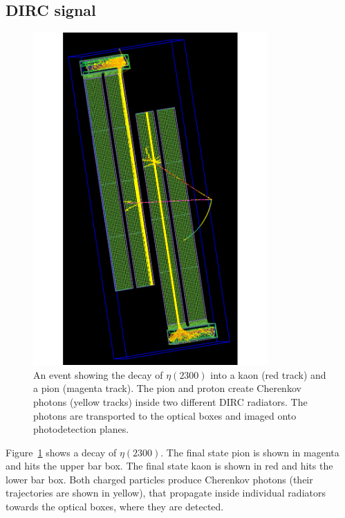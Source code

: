 \subsection{DIRC signal}

\begin{figure}[!h]
\centering
\includegraphics[angle=270,width=0.8\textwidth]{pics/eta2300decay.pdf}
\caption{\label{pic:eta2300}
An event showing the decay of $\eta(2300)$ into a kaon (red track) and a pion (magenta track). 
The pion and proton create Cherenkov photons (yellow tracks) inside two different DIRC radiators. The photons are transported to the optical boxes and imaged onto photodetection planes.
}
\end{figure}

Figure~\ref{pic:eta2300} shows a decay of $\eta(2300)$. The final state pion is shown in magenta and hits the upper bar box. The final state kaon is shown in red and hits the lower bar box. Both charged particles produce Cherenkov photons (their trajectories are shown in yellow), that propagate inside individual radiators towards the optical boxes, where they are detected. 


